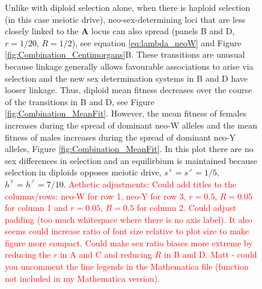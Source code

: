 \documentclass[12pt]{article}
\begin{document}
\begin{figure}[!h]
{Unlike with diploid selection alone, when there is haploid selection (in this case meiotic drive), neo-sex-determining loci that are less closely linked to the \textbf{A} locus can also spread (panels B and D, $r=1/20$, $R=1/2$), see equation \eqref{eq:lambda_neoW} and Figure \ref{fig:Combination_Centimorgans}B. 
These transitions are unusual because linkage generally allows favourable associations to arise via selection and the new sex determination systems in B and D have looser linkage. 
Thus, diploid mean fitness decreases over the course of the transitions in B and D, see Figure \ref{fig:Combination_MeanFit}.
However, the mean fitness of females increases during the spread of dominant neo-W alleles and the mean fitness of males increases during the spread of dominant neo-Y alleles, Figure \ref{fig:Combination_MeanFit}. 
In this plot there are no sex differences in selection and an equilirbium is maintained because selection in diploids opposes meiotic drive, $s^\female =s^\male = 1/5$, $h^\female = h^\male = 7/10$.
\textcolor{red}{Aethetic adjustments: Could add titles to the columns/rows: neo-W for row 1, neo-Y for row 3, $r=0.5$, $R=0.05$ for column 1 and $r=0.05$, $R=0.5$ for column 2. Could adjust padding (too much whitespace where there is no axis label). It also seems could increase ratio of font size relative to plot size to make figure more compact. Could make sex ratio biases more extreme by reducing the $r$ in A and C and reducing $R$ in B and D. Matt - could you uncomment the line legends in the Mathematica file (function not included in my Mathematica version).}
}
\label{fig:Combination_Turnover}
\end{figure}
\newpage
\end{document}
